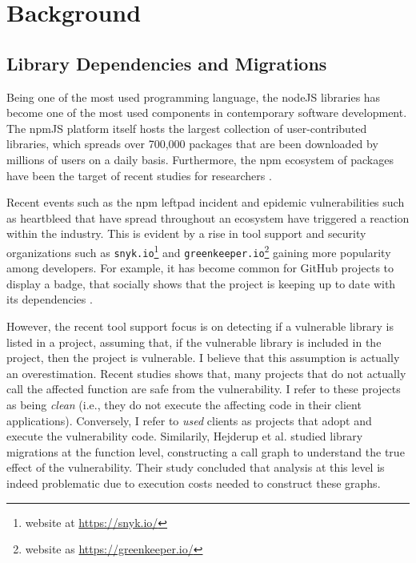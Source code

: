 \chapter{Background}
\label{sec:background}
\section{Library Dependencies and Migrations}
Being one of the most used programming language, the nodeJS libraries has become one of the most used components in contemporary software development.
The npmJS platform itself hosts the largest collection of user-contributed libraries, which spreads over 700,000 packages that are been downloaded by millions of users on a daily basis. 
Furthermore, the npm ecosystem of packages have been the target of recent studies for researchers \cite{Wittern:2016,Kikas:2017,decan2018impact}.

Recent events such as the npm leftpad incident \cite{Web:left-pad} and epidemic vulnerabilities such as heartbleed \cite{Web:heartbleed} that have spread throughout an ecosystem have triggered a reaction within the industry.
This is evident by a rise in tool support and security organizations such as \texttt{snyk.io}\footnote{website at \url{https://snyk.io/}} and \texttt{greenkeeper.io}\footnote{website as \url{https://greenkeeper.io/}} gaining more popularity among developers.
For example, it has become common for GitHub projects to display a badge, that socially shows that the project is keeping up to date with its dependencies \cite{Trockman:2018,Mirhosseini:2017}.

However, the recent tool support focus is on detecting if a vulnerable library is listed in a project, assuming that, if the vulnerable library is included in the project, then the project is vulnerable. I believe that this assumption is actually an overestimation.
Recent studies \cite{Hejderup:2018,Ponta:2018} shows that, many projects that do not actually call the affected function are safe from the vulnerability. I refer to these projects as being \textit{clean} (i.e., they do not execute the affecting code in their client applications).
Conversely, I refer to \textit{used} clients as projects that adopt and execute the vulnerability code.
Similarily, Hejderup et al. studied library migrations at the function level, constructing a call graph to understand the true effect of the vulnerability. 
Their study concluded that analysis at this level is indeed problematic due to execution costs needed to construct these graphs.


